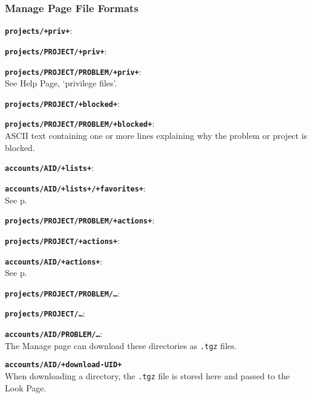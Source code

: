 \documentclass[12pt]{article}
\newenvironment{indpar}[1][0.4in]%
	{\begin{list}{}%
		     {\setlength{\itemsep}{0in}%
		      \setlength{\topsep}{0in}%
		      \setlength{\parsep}{1ex}%
		      \setlength{\labelwidth}{#1}%
		      \setlength{\leftmargin}{#1}%
		      \addtolength{\leftmargin}{\labelsep}}%
	 \item}%
	{\end{list}}
\newenvironment{itemlist}[1][0.2in]%
	{\begin{list}{}{\setlength{\labelwidth}{#1}%
		        \setlength{\leftmargin}{\labelwidth}%
		        \addtolength{\leftmargin}{+0.2in}%
		        \addtolength{\linewidth}{-\labelwidth}%
		        \addtolength{\linewidth}{-0.2in}%
		        \renewcommand{\makelabel}[1]{##1\hfill}}
	 \raggedright}%
	{\end{list}}
\newcommand{\TT}[1]{{\tt \bfseries #1}}
\newcommand{\pagref}[1]{p\pageref{#1}}
\begin{document}
\subsubsection{Manage Page File Formats}

\begin{indpar}
\begin{itemlist}
\item[\TT{projects/+priv+}:]
\item[\TT{projects/PROJECT/+priv+}:]\vspace*{-1ex}~
\item[\TT{projects/PROJECT/PROBLEM/+priv+}:]\vspace*{-1ex}~
\label{PRIV} \\
See Help Page, `privilege files'.
\item[\TT{projects/PROJECT/+blocked+}:]
\item[\TT{projects/PROJECT/PROBLEM/+blocked+}:]\vspace*{-1ex}~
\label{BLOCKED} \\
ASCII text containing one or more lines explaining why the
problem or project is blocked.
\item[\TT{accounts/AID/+lists+}:]
\item[\TT{accounts/AID/+lists+/+favorites+}:]\vspace*{-1ex}~ \\
See \pagref{FAVORITES}.
\item[\TT{projects/PROJECT/PROBLEM/+actions+}:]
\item[\TT{projects/PROJECT/+actions+}:]\vspace*{-1ex}
\item[\TT{accounts/AID/+actions+}:]\vspace*{-1ex}~ \\
See \pagref{ACCOUNT-ACTIONS}.
\item[\TT{projects/PROJECT/PROBLEM/\ldots}:]
\item[\TT{projects/PROJECT/\ldots}:]\vspace*{-1ex}
\item[\TT{accounts/AID/PROBLEM/\ldots}:]\vspace*{-1ex} ~ \\
The Manage page can download these directories as {\tt .tgz} files.
\item[\TT{accounts/AID/+download-UID+}] \\
When downloading a directory, the {\tt .tgz} file is stored
here and passed to the Look Page.

\end{itemlist}
\end{indpar}
\end{document}
